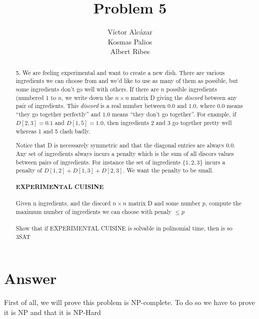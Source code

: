 \documentclass[a4paper,10pt]{article}
\title{Problem 5}
\author{
Víctor Alcázar \\
Kosmas Palios \\
Albert Ribes
}
\begin{document}
\maketitle



\begin{abstract}

5. We are feeling experimental and want to create a new dish. There are various ingredients we can choose from and we'd like to use as many of them as possible, but some ingredients don't go well with others. If there are $n$ possible ingredients (numbered 1 to $n$, we write down the $n\times n$ matrix D giving the \textit{discord} between any pair of ingredients. This \textit{discord} is a real number between $0.0$ and $1.0$, where $0.0$ means ``they go together perfectly'' and $1.0$ means ``they don't go together''. For example, if $D[2,3] = 0.1$ and $D[1,5] = 1.0$, then ingredients 2 and 3 go together pretty well whereas 1  and 5 clash badly.

Notice that D is necessarely symmetric and that the diagonal entries are always $0.0$. Any set of ingredients always incurs a penalty which is the sum of all discors values between pairs of ingredients. For instance the set of ingredients $\{1,2,3\}$ incurs a penalty of $D[1,2] + D[1,3] + D[2,3]$. We want the penalty to be small.

\paragraph{EXPERIMENTAL CUISINE}
Given n ingredients, and the discord $n \times n$ matrix D and some number $p$, compute the maximum number of ingredients we can choose with penaly $\leq p$
\\
\\
Show that if EXPERIMENTAL CUISINE is solvable in polinomial time, then is so 3SAT
\end{abstract}


\section{Answer}
First of all, we will prove this problem is NP-complete. To do so we have to prove it is NP and that it is NP-Hard
\end{document}
